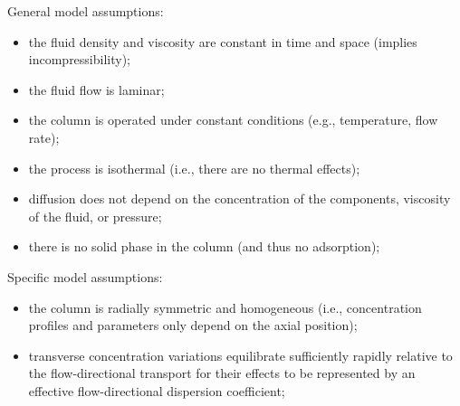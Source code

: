 \documentclass{article}
\begin{document}
General model assumptions:
\begin{itemize}
    \item the fluid density and viscosity are constant in time and space (implies incompressibility);
    \item the fluid flow is laminar;
    \item the column is operated under constant conditions (e.g., temperature, flow rate);
    \item the process is isothermal (i.e., there are no thermal effects);
    \item diffusion does not depend on the concentration of the components, viscosity of the fluid, or pressure;
    \item there is no solid phase in the column (and thus no adsorption);
\end{itemize}

Specific model assumptions:
\begin{itemize}
    \item the column is radially symmetric and homogeneous (i.e., concentration profiles and parameters only depend on the axial position);
    \item transverse concentration variations equilibrate sufficiently rapidly relative to the flow-directional transport for their effects to be represented by an effective flow-directional dispersion coefficient;
\end{itemize}
\end{document}
